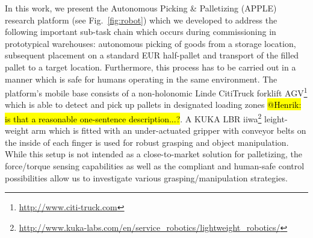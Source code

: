 In this work, we present the Autonomous Picking \& Palletizing (APPLE) research platform (see
Fig.~\ref{fig:robot}) which we developed to address the following important sub-task chain which
occurs during commissioning in prototypical warehouses: autonomous picking of goods from a storage
location, subsequent placement on a standard EUR half-pallet and transport of the filled pallet to a
target location. Furthermore, this process has to be carried out in a manner which is safe for
humans operating in the same environment. The platform's mobile base consists of a non-holonomic
Linde CitiTruck forklift AGV\footnote{\url{ http://www.citi-truck.com}} which is able to detect and
pick up pallets in designated loading zones \hl{@Henrik: is that a reasonable one-sentence
  description...?}. A KUKA LBR
iiwa\footnote{\url{http://www.kuka-labs.com/en/service_robotics/lightweight_robotics/}}
leight-weight arm which is fitted with an under-actuated gripper with conveyor belts on the inside
of each finger is used for robust grasping and object manipulation. While this setup is not intended
as a close-to-market solution for palletizing, the force/torque sensing capabilities as well as the
compliant and human-safe control possibilities allow us to investigate various grasping/manipulation
strategies.
%
